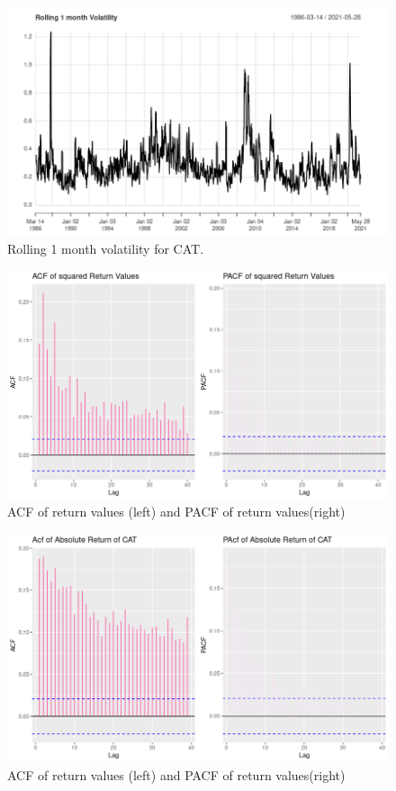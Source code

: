 \documentclass{article}
\begin{document}
\begin{figure}
	\centering
	\includegraphics[width=\linewidth]{monthly_volatility}
	\caption{Rolling 1 month volatility for CAT.}
	\label{fig:volatility}
\end{figure}
\begin{figure}
	\centering
	\includegraphics[width=\linewidth]{acf_pacf_squared}
	\caption{ACF of return values (left) and PACF of return values(right)}
	\label{fig:acfErr}
\end{figure}

\begin{figure}
	\centering
	\includegraphics[width=\linewidth]{acf_pacf_of_cat}
	\caption{ACF of return values (left) and PACF of return values(right)}
	\label{fig:acf}
\end{figure}
\end{document}
